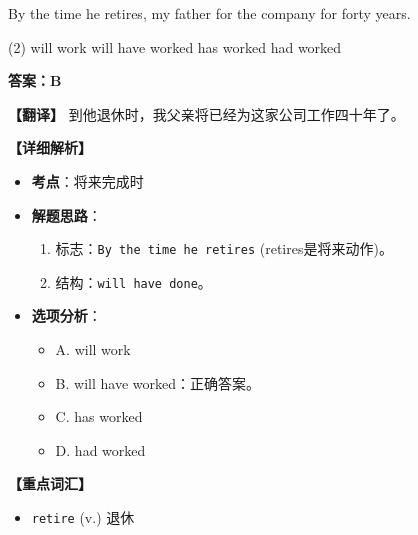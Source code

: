 \documentclass[11pt, a4paper]{article}
\newcommand{\analysis}[4]{
    \begin{solutionbox}
        \textbf{答案：#1}
        
        \textbf{【翻译】} #2
        
        \textbf{【详细解析】}
        #3
        
        \textbf{【重点词汇】}
        #4
    \end{solutionbox}
}
\newcommand{\blank}{\underline{\hspace{1.5cm}}}
\begin{document}
\begin{questions}
    \item By the time he retires, my father \blank for the company for forty years.
    \begin{tasks}(2)
        \task will work \task will have worked
        \task has worked \task had worked
    \end{tasks}
    \analysis{B}{到他退休时，我父亲将已经为这家公司工作四十年了。}{
        \begin{itemize}
            \item \textbf{考点}：将来完成时
            \item \textbf{解题思路}：
                \begin{enumerate}
                    \item 标志：\texttt{By the time he retires} (retires是将来动作)。
                    \item 结构：\texttt{will have done}。
                \end{enumerate}
            \item \textbf{选项分析}：
                \begin{itemize}
                    \item A. will work
                    \item B. will have worked：正确答案。
                    \item C. has worked
                    \item D. had worked
                \end{itemize}
        \end{itemize}
    }{
        \begin{itemize}
            \item \texttt{retire} (v.) 退休
        \end{itemize}
    }


\end{questions}
\end{document}
